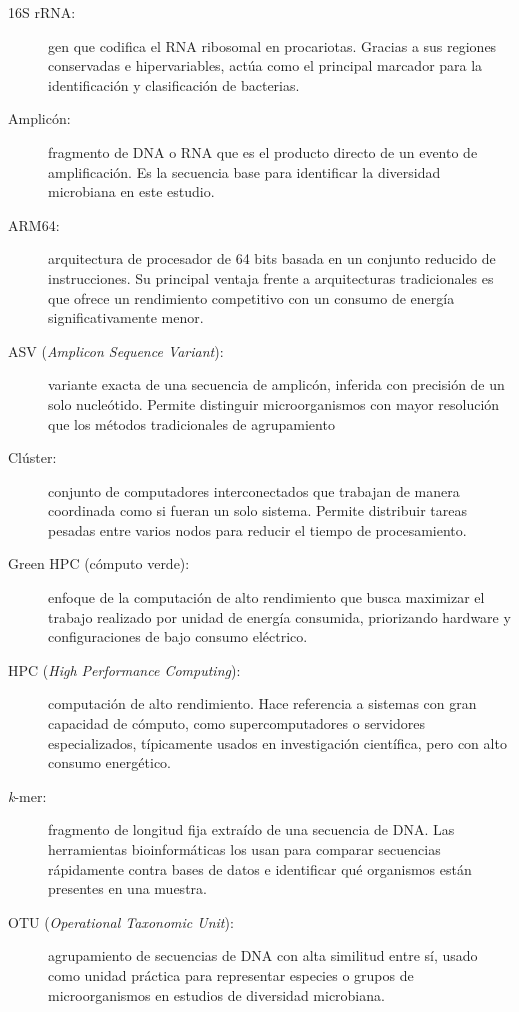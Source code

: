 \documentclass[12pt,oneside,spanish]{book}
\begin{document}
    \begin{description}
        \item[16S rRNA:] gen que codifica el RNA ribosomal en procariotas. Gracias a sus regiones conservadas e hipervariables, actúa como el principal marcador para la identificación y clasificación de bacterias.
        \item[Amplicón:] fragmento de DNA o RNA que es el producto directo de un evento de amplificación. Es la secuencia base para identificar la diversidad microbiana en este estudio.
        
        \item[ARM64:] arquitectura de procesador de 64 bits basada en un conjunto reducido de instrucciones. Su principal ventaja frente a arquitecturas tradicionales es que ofrece un rendimiento competitivo con un consumo de energía significativamente menor.
        
        \item[ASV (\textit{Amplicon Sequence Variant}):] variante exacta de una secuencia de amplicón, inferida con precisión de un solo nucleótido. Permite distinguir microorganismos con mayor resolución que los métodos tradicionales de agrupamiento
        
        \item[Clúster:] conjunto de computadores interconectados que trabajan de manera coordinada como si fueran un solo sistema. Permite distribuir tareas pesadas entre varios nodos para reducir el tiempo de procesamiento.
        
        \item[Green HPC (cómputo verde):] enfoque de la computación de alto rendimiento que busca maximizar el trabajo realizado por unidad de energía consumida, priorizando hardware y configuraciones de bajo consumo eléctrico.
        \item[HPC (\textit{High Performance Computing}):] computación de alto rendimiento. Hace referencia a sistemas con gran capacidad de cómputo, como supercomputadores o servidores especializados, típicamente usados en investigación científica, pero con alto consumo energético.
        
        \item[\textit{k}-mer:] fragmento de longitud fija extraído de una secuencia de DNA. Las herramientas bioinformáticas los usan para comparar secuencias rápidamente contra bases de datos e identificar qué organismos están presentes en una muestra.
        
        \item[OTU (\textit{Operational Taxonomic Unit}):] agrupamiento de secuencias de DNA con alta similitud entre sí, usado como unidad práctica para representar especies o grupos de microorganismos en estudios de diversidad microbiana.
        

\end{description}
\end{document}

